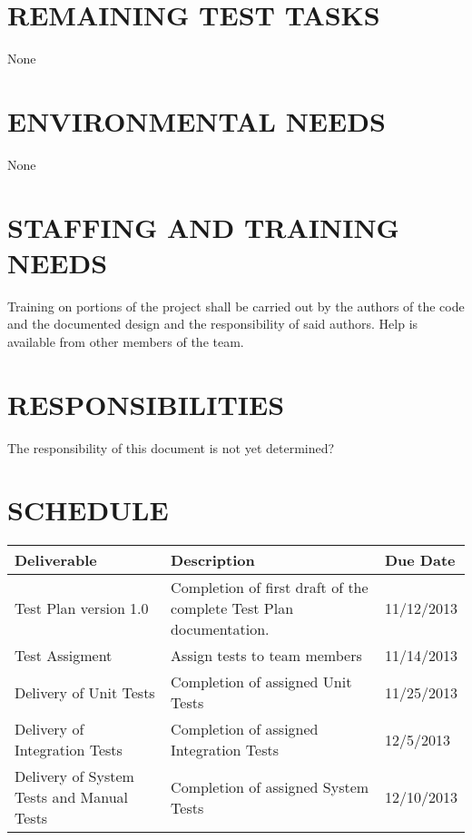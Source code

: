 \documentclass[report]{article}
\begin{document}
\section[REMAINING TEST TASKS]{REMAINING TEST TASKS}
None

\section[EVIRONMENTAL NEEDS]{ENVIRONMENTAL NEEDS}
None

\section[STAFFING AND TRAINING NEEDS]{STAFFING AND TRAINING NEEDS}
Training on portions of the project shall be carried out by the authors of the code and the documented design and the responsibility of said authors. Help is available from other members of the team.


\section[RESPONSIBILITIES]{RESPONSIBILITIES}
The responsibility of this document is not yet determined?


\section[SCHEDULE]{SCHEDULE}
\begin{center}
\begin{tabularx}{\textwidth}{| X | X | X |}
  \hline
  \textbf{Deliverable} &
  \textbf{Description} &
  \textbf{Due Date} 
\\ \hline
Test Plan version 1.0 & 
Completion of first draft of the complete Test Plan documentation. &
11/12/2013
\\ \hline

Test Assigment &
Assign tests to team members &
11/14/2013
\\ \hline

Delivery of Unit Tests &
Completion of assigned Unit Tests &
11/25/2013
\\ \hline

Delivery of Integration Tests &
Completion of assigned Integration Tests &
12/5/2013
\\ \hline

Delivery of System Tests and Manual Tests &
Completion of assigned System Tests &
12/10/2013
\\ \hline

\end{tabularx}
\end{center}
\end{document}
